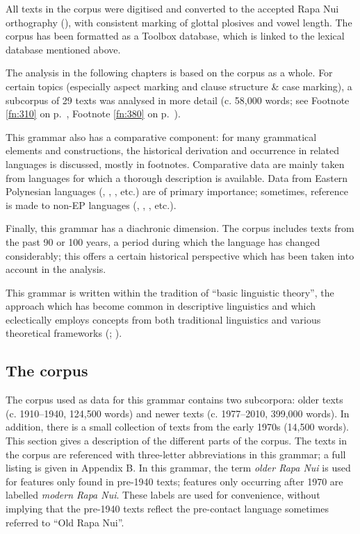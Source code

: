 All texts in the corpus were digitised and converted to the accepted Rapa Nui orthography (), with consistent marking of glottal plosives and vowel length. The corpus has been formatted as a Toolbox database, which is linked to the lexical database mentioned above.

The analysis in the following chapters is based on the corpus as a whole. For certain topics (especially aspect marking and clause structure \& case marking), a subcorpus of 29 texts was analysed in more detail (c. 58,000 words; see Footnote \ref{fn:310} on p.~\pageref{fn:310}, Footnote \ref{fn:380} on p.~\pageref{fn:380}).

This grammar also has a comparative component: for many grammatical elements and constructions, the historical derivation and occurrence in related languages is discussed, mostly in footnotes. Comparative data are mainly taken from languages for which a thorough description is available. Data from Eastern Polynesian languages (, , , etc.) are of primary importance; sometimes, reference is made to non-EP languages (, , , etc.). 

Finally, this grammar has a diachronic dimension. The corpus includes texts from the past 90 or 100 years, a period during which the language has changed considerably; this offers a certain historical perspective which has been taken into account in the analysis.

This grammar is written within the tradition of “basic linguistic theory”, the approach which has become common in descriptive linguistics and which eclectically employs concepts from both traditional linguistics and various theoretical frameworks (\citealt{Dryer2001,Dryer2006}; \citealt{Dixon2010-1,Dixon2010-2,Dixon2012}). 

\subsection{The corpus}\label{sec:1.6.2}

The corpus used as data for this grammar contains two subcorpora: older texts (c. 1910–1940, 124,500 words) and newer texts (c. 1977–2010, 399,000 words). In addition, there is a small collection of texts from the early 1970s (14,500 words). This section gives a description of the different parts of the corpus. The texts in the corpus are referenced with three-letter abbreviations in this grammar; a full listing is given in Appendix B. In this grammar, the term \textit{older Rapa Nui} is used for features only found in pre-1940 texts; features only occurring after 1970 are labelled \textit{modern Rapa Nui}. These labels are used for convenience, without implying that the pre-1940 texts reflect the pre-contact language sometimes referred to “Old Rapa Nui”.

